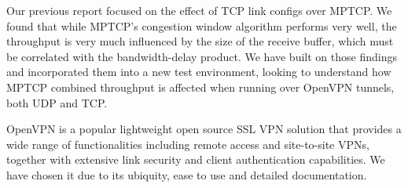Our previous report \cite{sem1} focused on the effect of TCP link configs over MPTCP. We found that while MPTCP's congestion window algorithm performs very well, the throughput is very much influenced by the size of the receive buffer, which must be correlated with the bandwidth-delay product. We have built on those findings and incorporated them into a new test environment, looking to understand how MPTCP combined throughput is affected when running over OpenVPN tunnels, both UDP and TCP.

OpenVPN is a popular lightweight open source SSL VPN solution that provides a wide range of functionalities including remote access and site-to-site VPNs, together with extensive link security and client authentication capabilities. We have chosen it due to its ubiquity, ease to use and detailed documentation.